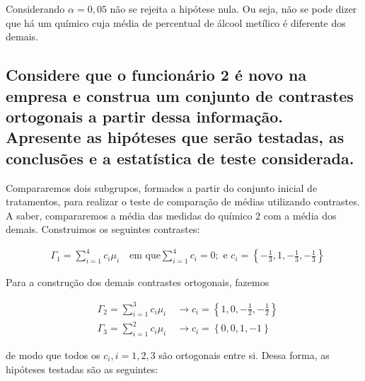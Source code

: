 \documentclass[
]{article}
\begin{document}
Considerando \(\alpha = 0,05\) não se rejeita a hipótese nula. Ou seja,
não se pode dizer que há um químico cuja média de percentual de álcool
metílico é diferente dos demais.

\hypertarget{considere-que-o-funcionuxe1rio-2-uxe9-novo-na-empresa-e-construa-um-conjunto-de-contrastes-ortogonais-a-partir-dessa-informauxe7uxe3o.-apresente-as-hipuxf3teses-que-seruxe3o-testadas-as-conclusuxf5es-e-a-estatuxedstica-de-teste-considerada.}{%
\subsection{Considere que o funcionário 2 é novo na empresa e construa
um conjunto de contrastes ortogonais a partir dessa informação.
Apresente as hipóteses que serão testadas, as conclusões e a estatística
de teste
considerada.}\label{considere-que-o-funcionuxe1rio-2-uxe9-novo-na-empresa-e-construa-um-conjunto-de-contrastes-ortogonais-a-partir-dessa-informauxe7uxe3o.-apresente-as-hipuxf3teses-que-seruxe3o-testadas-as-conclusuxf5es-e-a-estatuxedstica-de-teste-considerada.}}

Compararemos dois subgrupos, formados a partir do conjunto inicial de
tratamentos, para realizar o teste de comparação de médias utilizando
contrastes. A saber, compararemos a média das medidas do químico 2 com a
média dos demais. Construimos os seguintes contrastes:

\begin{align}
  &\Gamma_1 = \sum\limits_{i = 1}^{4} c_i \mu_i \quad \text{em que} \sum\limits_{i = 1}^{4} c_i = 0; \text{ e } c_i = \left\{-\frac{1}{3}, 1, -\frac{1}{3}, -\frac{1}{3}\right\}
\end{align}

Para a construção dos demais contrastes ortogonais, fazemos

\begin{align*}
  &\Gamma_2 = \sum\limits_{i = 1}^{3} c_i \mu_i \quad \longrightarrow
  c_i = \left\{1, 0, -\frac{1}{2}, -\frac{1}{2}\right\} \\
  &\Gamma_3 = \sum\limits_{i = 1}^{2} c_i \mu_i \quad \longrightarrow
  c_i = \left\{0, 0, 1, -1\right\}
\end{align*}

de modo que todos os \(c_i, i = 1, 2, 3\) são ortogonais entre si. Dessa
forma, as hipóteses testadas são as seguintes:
\end{document}
